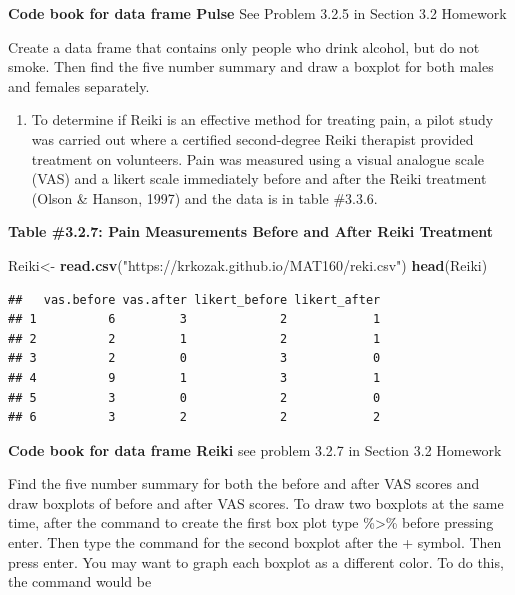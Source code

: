 \documentclass[
]{book}
\newenvironment{Shaded}{\begin{snugshade}}{\end{snugshade}}
\newcommand{\KeywordTok}[1]{\textcolor[rgb]{0.13,0.29,0.53}{\textbf{#1}}}
\newcommand{\NormalTok}[1]{#1}
\newcommand{\StringTok}[1]{\textcolor[rgb]{0.31,0.60,0.02}{#1}}
\providecommand{\tightlist}{%
  \setlength{\itemsep}{0pt}\setlength{\parskip}{0pt}}
\begin{document}
\textbf{Code book for data frame Pulse} See Problem 3.2.5 in Section 3.2 Homework

Create a data frame that contains only people who drink alcohol, but do not smoke. Then find the five number summary and draw a boxplot for both males and females separately.

\begin{enumerate}
\def\labelenumi{\arabic{enumi}.}
\setcounter{enumi}{8}
\tightlist
\item
  To determine if Reiki is an effective method for treating pain, a pilot study was carried out where a certified second-degree Reiki therapist provided treatment on volunteers. Pain was measured using a visual analogue scale (VAS) and a likert scale immediately before and after the Reiki treatment (Olson \& Hanson, 1997) and the data is in table \#3.3.6.
\end{enumerate}

\textbf{Table \#3.2.7: Pain Measurements Before and After Reiki Treatment}

\begin{Shaded}
\begin{Highlighting}[]
\NormalTok{Reiki<-}\StringTok{ }\KeywordTok{read.csv}\NormalTok{(}\StringTok{"https://krkozak.github.io/MAT160/reki.csv"}\NormalTok{)}
\KeywordTok{head}\NormalTok{(Reiki)}
\end{Highlighting}
\end{Shaded}

\begin{verbatim}
##   vas.before vas.after likert_before likert_after
## 1          6         3             2            1
## 2          2         1             2            1
## 3          2         0             3            0
## 4          9         1             3            1
## 5          3         0             2            0
## 6          3         2             2            2
\end{verbatim}

\textbf{Code book for data frame Reiki} see problem 3.2.7 in Section 3.2 Homework

Find the five number summary for both the before and after VAS scores and draw boxplots of before and after VAS scores. To draw two boxplots at the same time, after the command to create the first box plot type \%\textgreater\% before pressing enter. Then type the command for the second boxplot after the + symbol. Then press enter. You may want to graph each boxplot as a different color. To do this, the command would be
\end{document}
